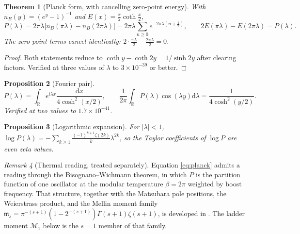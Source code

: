 \documentclass[12pt,a4paper]{article}
\theoremstyle{plain}
\newtheorem{theorem}{Theorem}[section]
\newtheorem{proposition}[theorem]{Proposition}
\theoremstyle{definition}
\theoremstyle{remark}
\newtheorem{remark}[theorem]{Remark}
\newcommand{\R}{\mathbb{R}}
\newcommand{\dd}{\mathrm{d}}
\newcommand{\cM}{\mathcal{M}}
\begin{document}
\begin{theorem}[Planck form, with cancelling zero-point energy]
\label{thm:planck}
With $n_B(y)=(e^y-1)^{-1}$ and $E(x)=\tfrac{x}{2}\coth\tfrac{x}{2}$,
\begin{equation}
P(\lambda)=2\pi\lambda\bigl[n_B(\pi\lambda)-n_B(2\pi\lambda)\bigr]
=2\pi\lambda\sum_{n\ge0}e^{-2\pi\lambda(n+\frac12)},
\qquad
2E(\pi\lambda)-E(2\pi\lambda)=P(\lambda).
\label{eq:planck}
\end{equation}
The zero-point terms cancel identically:
$2\cdot\tfrac{\pi\lambda}{2}-\tfrac{2\pi\lambda}{2}=0$.
\end{theorem}

\begin{proof}
Both statements reduce to
$\coth y-\coth 2y=1/\sinh 2y$ after clearing factors. Verified at three
values of $\lambda$ to $3\times10^{-39}$ or better.
\end{proof}

\begin{proposition}[Fourier pair]
\label{prop:fourier}
\begin{equation}
P(\lambda)=\int_\R e^{i\lambda x}\frac{\dd x}{4\cosh^2(x/2)},
\qquad
\frac{1}{2\pi}\int_\R P(\lambda)\cos(\lambda y)\dd\lambda
=\frac{1}{4\cosh^2(y/2)} .
\label{eq:fourier}
\end{equation}
Verified at two values to $1.7\times10^{-41}$.
\end{proposition}

\begin{proposition}[Logarithmic expansion]
\label{prop:log}
For $|\lambda|<1$,
$\log P(\lambda)=-\sum_{k\ge1}\frac{(-1)^{k+1}\zeta(2k)}{k}\lambda^{2k}$,
so the Taylor coefficients of $\log P$ are even zeta values.
\end{proposition}

\begin{remark}[Thermal reading, treated separately]
\label{rem:thermal}
Equation \eqref{eq:planck} admits a reading through the
Bisognano--Wichmann theorem, in which $P$ is the partition function of
one oscillator at the modular temperature $\beta=2\pi$ weighted by
boost frequency. That structure, together with the Matsubara pole
positions, the Weierstrass product, and the Mellin moment family
$\mathfrak m_s=\pi^{-(s+1)}(1-2^{-(s+1)})\Gamma(s+1)\zeta(s+1)$, is
developed in \cite{ToupinThermal}. The ladder moment $\cM_1$ below is
the $s=1$ member of that family.
\end{remark}

\end{document}

